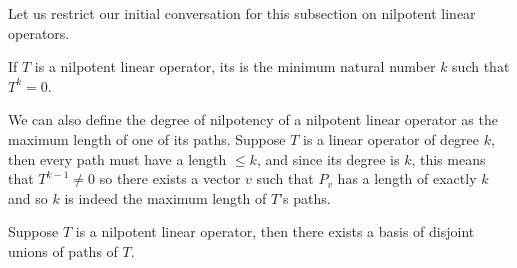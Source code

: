Let us restrict our initial conversation for this subsection on nilpotent linear operators.

\begin{defn*}

    If $T$ is a nilpotent linear operator, its  is the minimum natural number $k$ such that $T^k=0$.

\end{defn*}

We can also define the degree of nilpotency of a nilpotent linear operator as the maximum length of one of its paths.
Suppose $T$ is a linear operator of degree $k$, then every path must have a length $\leq k$, and since its degree is $k$, this means that $T^{k-1}\neq0$ so there exists a vector $v$ such that $P_v$ has a
length of exactly $k$ and so $k$ is indeed the maximum length of $T$'s paths.

\begin{thrm*}

    Suppose $T$ is a nilpotent linear operator, then there exists a basis of disjoint unions of paths of $T$.

\end{thrm*}


